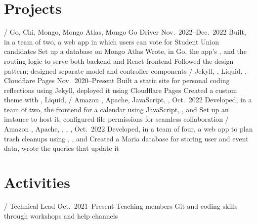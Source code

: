\section{Projects}
\begin{outline}
     / Go, Chi, Mongo, Mongo Atlas, Mongo Go Driver
    \hfill Nov.\ 2022--Dec.\ 2022
        \1 Built, in a team of two, a web app in which users can vote for Student Union candidates
            \2 Set up a database on Mongo Atlas
            \2 Wrote, in Go, the app's  , and the routing logic to serve both backend and React frontend
            \2 Followed the  design pattern; designed separate model and controller components
     / Jekyll, , Liquid, , Cloudflare Pages
    \hfill Nov.\ 2020--Present
        \1 Built a static site for personal coding reflections using Jekyll, deployed it using Cloudflare Pages
            \2 Created a custom theme with , Liquid, 
     / Amazon , Apache, JavaScript, , 
    \hfill Oct.\ 2022
        \1 Developed, in a team of two, the frontend for a calendar using JavaScript, , and 
            \2 Set up an  instance to host it, configured file permissions for seamless collaboration
     / Amazon , Apache, , , , 
    \hfill Oct.\ 2022
        \1 Developed, in a team of four, a web app to plan trash cleanups using , , and 
            \2 Created a Maria database for storing user and event data, wrote the  queries that update it
\end{outline}

\section{Activities}
\begin{outline}
     / Technical Lead
    \hfill Oct.\ 2021--Present
        \1 Teaching members Git and coding skills through workshops and help channels
\end{outline}
